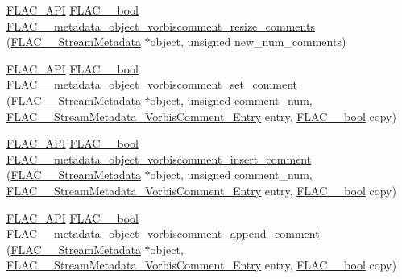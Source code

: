\begin{DoxyCompactItemize}
\item 
\hyperlink{group__flac__export_ga56ca07df8a23310707732b1c0007d6f5}{F\+L\+A\+C\+\_\+\+A\+PI} \hyperlink{ordinals_8h_a95103469f1cbd78b8cf250194985b34e}{F\+L\+A\+C\+\_\+\+\_\+bool} \hyperlink{group__flac__metadata__object_ga264611f0af9b5e09d083c1ca5495f1c4}{F\+L\+A\+C\+\_\+\+\_\+metadata\+\_\+object\+\_\+vorbiscomment\+\_\+resize\+\_\+comments} (\hyperlink{struct_f_l_a_c_____stream_metadata}{F\+L\+A\+C\+\_\+\+\_\+\+Stream\+Metadata} $\ast$object, unsigned new\+\_\+num\+\_\+comments)
\item 
\hyperlink{group__flac__export_ga56ca07df8a23310707732b1c0007d6f5}{F\+L\+A\+C\+\_\+\+A\+PI} \hyperlink{ordinals_8h_a95103469f1cbd78b8cf250194985b34e}{F\+L\+A\+C\+\_\+\+\_\+bool} \hyperlink{group__flac__metadata__object_gadf034b2c385e7932c6be2d724a0deae3}{F\+L\+A\+C\+\_\+\+\_\+metadata\+\_\+object\+\_\+vorbiscomment\+\_\+set\+\_\+comment} (\hyperlink{struct_f_l_a_c_____stream_metadata}{F\+L\+A\+C\+\_\+\+\_\+\+Stream\+Metadata} $\ast$object, unsigned comment\+\_\+num, \hyperlink{struct_f_l_a_c_____stream_metadata___vorbis_comment___entry}{F\+L\+A\+C\+\_\+\+\_\+\+Stream\+Metadata\+\_\+\+Vorbis\+Comment\+\_\+\+Entry} entry, \hyperlink{ordinals_8h_a95103469f1cbd78b8cf250194985b34e}{F\+L\+A\+C\+\_\+\+\_\+bool} copy)
\item 
\hyperlink{group__flac__export_ga56ca07df8a23310707732b1c0007d6f5}{F\+L\+A\+C\+\_\+\+A\+PI} \hyperlink{ordinals_8h_a95103469f1cbd78b8cf250194985b34e}{F\+L\+A\+C\+\_\+\+\_\+bool} \hyperlink{group__flac__metadata__object_ga0c23f59f465f302b35a2d3ab1eae07e7}{F\+L\+A\+C\+\_\+\+\_\+metadata\+\_\+object\+\_\+vorbiscomment\+\_\+insert\+\_\+comment} (\hyperlink{struct_f_l_a_c_____stream_metadata}{F\+L\+A\+C\+\_\+\+\_\+\+Stream\+Metadata} $\ast$object, unsigned comment\+\_\+num, \hyperlink{struct_f_l_a_c_____stream_metadata___vorbis_comment___entry}{F\+L\+A\+C\+\_\+\+\_\+\+Stream\+Metadata\+\_\+\+Vorbis\+Comment\+\_\+\+Entry} entry, \hyperlink{ordinals_8h_a95103469f1cbd78b8cf250194985b34e}{F\+L\+A\+C\+\_\+\+\_\+bool} copy)
\item 
\hyperlink{group__flac__export_ga56ca07df8a23310707732b1c0007d6f5}{F\+L\+A\+C\+\_\+\+A\+PI} \hyperlink{ordinals_8h_a95103469f1cbd78b8cf250194985b34e}{F\+L\+A\+C\+\_\+\+\_\+bool} \hyperlink{group__flac__metadata__object_gad04ef80ae5f852db8f3729a6ef8c1631}{F\+L\+A\+C\+\_\+\+\_\+metadata\+\_\+object\+\_\+vorbiscomment\+\_\+append\+\_\+comment} (\hyperlink{struct_f_l_a_c_____stream_metadata}{F\+L\+A\+C\+\_\+\+\_\+\+Stream\+Metadata} $\ast$object, \hyperlink{struct_f_l_a_c_____stream_metadata___vorbis_comment___entry}{F\+L\+A\+C\+\_\+\+\_\+\+Stream\+Metadata\+\_\+\+Vorbis\+Comment\+\_\+\+Entry} entry, \hyperlink{ordinals_8h_a95103469f1cbd78b8cf250194985b34e}{F\+L\+A\+C\+\_\+\+\_\+bool} copy)

\end{DoxyCompactItemize}
